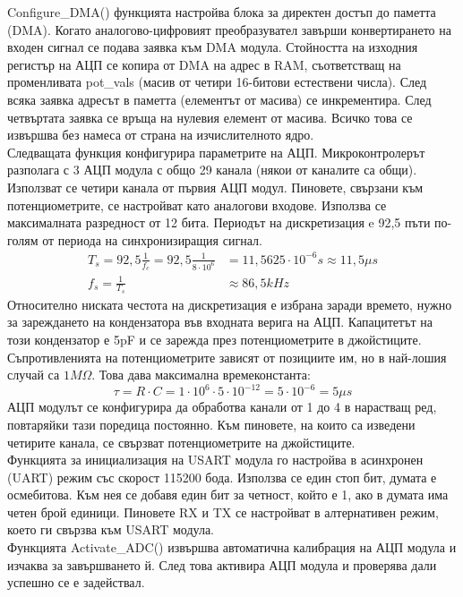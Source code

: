\indent{}
Configure\_DMA() функцията настройва блока за директен достъп до паметта (DMA). Когато аналогово-цифровият преобразувател завърши конвертирането на входен сигнал се подава заявка към DMA модула. Стойността на изходния регистър на АЦП се копира от DMA на адрес в RAM, съответстващ на променливата pot\_vals (масив от четири 16-битови естествени числа). След всяка заявка адресът в паметта (елементът от масива) се инкрементира. След четвъртата заявка се връща на нулевия елемент от масива. Всичко това се извършва без намеса от страна на изчислителното ядро.\\
\indent{}
Следващата функция конфигурира параметрите на АЦП. Микроконтролерът разполага с 3 АЦП модула с общо 29 канала (някои от каналите са общи). Използват се четири канала от първия АЦП модул. Пиновете, свързани към потенциометрите, се настройват като аналогови входове. Използва се максималната разредност от 12 бита. Периодът на дискретизация e 92,5 пъти по-голям от периода на синхронизиращия сигнал.
\begin{align}
    T_s = 92,5 \frac{1}{f_c} = 92,5 \frac{1}{8\cdot10^6} &= 11,5625 \cdot 10^{-6} s \approx 11,5 \mu s\\
    f_s = \frac{1}{T_s} &\approx 86,5 kHz
\end{align}
Относително ниската честота на дискретизация е избрана заради времето, нужно за зареждането на кондензатора във входната верига на АЦП. Капацитетът на този кондензатор е 5pF \cite{mcu_specs} и се зарежда през потенциометрите в джойстиците. Съпротивленията на потенциометрите зависят от позициите им, но в най-лошия случай са $1M\Omega$. Това дава максимална времеконстанта:
\begin{equation}
    \tau = R \cdot C = 1 \cdot 10^{6} \cdot 5 \cdot 10^{-12} = 5 \cdot 10^{-6} = 5 \mu s
\end{equation}
АЦП модулът се конфигурира да обработва канали от 1 до 4 в нарастващ ред, повтаряйки тази поредица постоянно. Към пиновете, на които са изведени четирите канала, се свързват потенциометрите на джойстиците.\\
\indent{}
Функцията за инициализация на USART модула го настройва в асинхронен (UART) режим със скорост 115200 бода. Използва се един стоп бит, думата е осмебитова. Към нея се добавя един бит за четност, който е 1, ако в думата има четен брой единици. Пиновете RX и TX се настройват в алтернативен режим, което ги свързва към USART модула.\\
\indent{}
Функцията Activate\_ADC() извършва автоматична калибрация на АЦП модула и изчаква за завършването й. След това активира АЦП модула и проверява дали успешно се е задействал.\\
